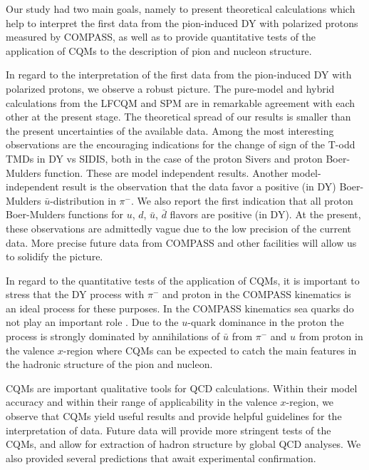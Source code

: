 \documentclass[a4paper]{article}
\begin{document}
Our study had two main goals, namely to present theoretical 
calculations which help to interpret the first data from the
pion-induced DY with polarized protons measured by COMPASS, 
as well as to provide quantitative tests of 
the application of 
CQMs to the description of pion and nucleon structure.

In regard to the interpretation of the first data from the
pion-induced DY with polarized protons, we observe a robust
picture. The pure-model and hybrid calculations from the
LFCQM and SPM are in remarkable agreement with each other
at the present stage. The theoretical spread of our
results is smaller than the present uncertainties of the
available data. Among the most interesting observations are
the encouraging indications for the change of sign of the
T-odd TMDs in DY vs SIDIS, both in the case of the proton
Sivers and proton Boer-Mulders function. These are model
independent results. Another model-independent result is
the observation that the data favor a positive (in DY)
Boer-Mulders $\bar u$-distribution in $\pi^-$.
We also report the first indication that all proton
Boer-Mulders functions for $u$, $d$, $\bar u$, $\bar d$
flavors are positive (in DY). At the present, these 
observations are admittedly vague due to the  
low precision of the 
current data. More precise
future data from COMPASS and other facilities will allow us 
to solidify the picture.

In regard to the quantitative tests of the application 
of CQMs, it is important to stress that the DY process
with $\pi^-$ and proton in the COMPASS kinematics is an ideal 
process for these purposes. In the COMPASS kinematics sea quarks 
do not play an important role \cite{Collins:2005rq}. Due to the 
$u$-quark dominance in the proton the process is strongly dominated 
by annihilations of $\bar u$ from $\pi^-$ and $u$ 
from proton in the valence $x$-region
where CQMs can be expected to catch the main features in the hadronic structure of the 
pion and nucleon. 

CQMs are important qualitative tools for QCD calculations. 
Within their model accuracy 
and within their range of applicability 
in the valence $x$-region,
we observe that CQMs  yield useful results and provide 
helpful guidelines for the interpretation of data. Future data 
will provide more stringent tests of the CQMs, and allow 
for extraction of  hadron structure 
by global QCD analyses. 
We also provided several predictions that await experimental
confirmation. 
\end{document}

